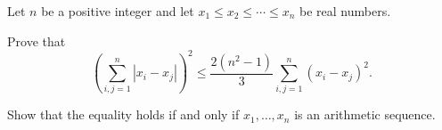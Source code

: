 Let $n$ be a positive integer and let $x_1\le x_2\le\cdots\le x_n$ be real numbers.

Prove that \[ \left(\sum_{i,j=1}^{n}|x_i-x_j|\right)^2\le\frac{2(n^2-1)}{3}\sum_{i,j=1}^{n}(x_i-x_j)^2.\]

Show that the equality holds if and only if $x_1, \ldots, x_n$ is an arithmetic sequence.
